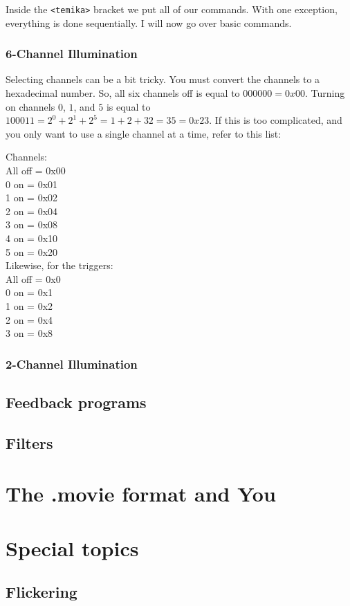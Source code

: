 \documentclass{article}
\begin{document}


Inside the \verb|<temika>| bracket we put all of our commands. With one exception, everything is done sequentially. I will now go over basic commands.\\

\newpage

\subsubsection{6-Channel Illumination}



Selecting channels can be a bit tricky. You must convert the channels to a hexadecimal number. So, all six channels off is equal to $000000 = 0x00$. Turning on channels $0$, $1$, and $5$ is equal to $100011 = 2^0 + 2^1 + 2^5 = 1 + 2 + 32 = 35 = 0x23$. If this is too complicated, and you only want to use a single channel at a time, refer to this list:

Channels:\\
All off = 0x00\\
0 on = 0x01\\
1 on = 0x02\\
2 on = 0x04\\
3 on = 0x08\\
4 on = 0x10\\
5 on = 0x20\\

Likewise, for the triggers:\\
All off = 0x0\\
0 on = 0x1\\
1 on = 0x2\\
2 on = 0x4\\
3 on = 0x8\\

\newpage

\subsubsection{2-Channel Illumination}



\subsection{Feedback programs}

\subsection{Filters}

\newpage

\section{The .movie format and You}

\section{Special topics}

\subsection{Flickering}
\end{document}

